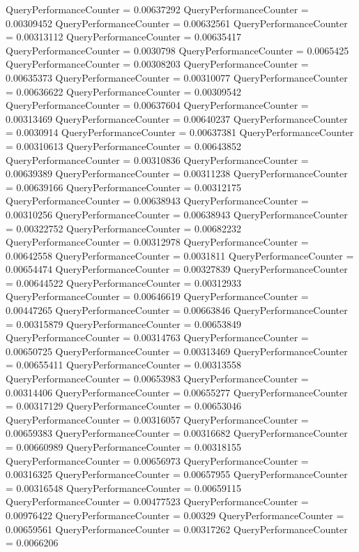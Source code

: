 \documentclass[9pt]{article}
\theoremstyle{plain}
\theoremstyle{definition}
\theoremstyle{remark}
\numberwithin{equation}{section}
\begin{document}
QueryPerformanceCounter  =  0.00637292
QueryPerformanceCounter  =  0.00309452
QueryPerformanceCounter  =  0.00632561
QueryPerformanceCounter  =  0.00313112
QueryPerformanceCounter  =  0.00635417
QueryPerformanceCounter  =  0.0030798
QueryPerformanceCounter  =  0.0065425
QueryPerformanceCounter  =  0.00308203
QueryPerformanceCounter  =  0.00635373
QueryPerformanceCounter  =  0.00310077
QueryPerformanceCounter  =  0.00636622
QueryPerformanceCounter  =  0.00309542
QueryPerformanceCounter  =  0.00637604
QueryPerformanceCounter  =  0.00313469
QueryPerformanceCounter  =  0.00640237
QueryPerformanceCounter  =  0.0030914
QueryPerformanceCounter  =  0.00637381
QueryPerformanceCounter  =  0.00310613
QueryPerformanceCounter  =  0.00643852
QueryPerformanceCounter  =  0.00310836
QueryPerformanceCounter  =  0.00639389
QueryPerformanceCounter  =  0.00311238
QueryPerformanceCounter  =  0.00639166
QueryPerformanceCounter  =  0.00312175
QueryPerformanceCounter  =  0.00638943
QueryPerformanceCounter  =  0.00310256
QueryPerformanceCounter  =  0.00638943
QueryPerformanceCounter  =  0.00322752
QueryPerformanceCounter  =  0.00682232
QueryPerformanceCounter  =  0.00312978
QueryPerformanceCounter  =  0.00642558
QueryPerformanceCounter  =  0.0031811
QueryPerformanceCounter  =  0.00654474
QueryPerformanceCounter  =  0.00327839
QueryPerformanceCounter  =  0.00644522
QueryPerformanceCounter  =  0.00312933
QueryPerformanceCounter  =  0.00646619
QueryPerformanceCounter  =  0.00447265
QueryPerformanceCounter  =  0.00663846
QueryPerformanceCounter  =  0.00315879
QueryPerformanceCounter  =  0.00653849
QueryPerformanceCounter  =  0.00314763
QueryPerformanceCounter  =  0.00650725
QueryPerformanceCounter  =  0.00313469
QueryPerformanceCounter  =  0.00655411
QueryPerformanceCounter  =  0.00313558
QueryPerformanceCounter  =  0.00653983
QueryPerformanceCounter  =  0.00314406
QueryPerformanceCounter  =  0.00655277
QueryPerformanceCounter  =  0.00317129
QueryPerformanceCounter  =  0.00653046
QueryPerformanceCounter  =  0.00316057
QueryPerformanceCounter  =  0.00659383
QueryPerformanceCounter  =  0.00316682
QueryPerformanceCounter  =  0.00660989
QueryPerformanceCounter  =  0.00318155
QueryPerformanceCounter  =  0.00656973
QueryPerformanceCounter  =  0.00316325
QueryPerformanceCounter  =  0.00657955
QueryPerformanceCounter  =  0.00316548
QueryPerformanceCounter  =  0.00659115
QueryPerformanceCounter  =  0.00477523
QueryPerformanceCounter  =  0.00976422
QueryPerformanceCounter  =  0.00329
QueryPerformanceCounter  =  0.00659561
QueryPerformanceCounter  =  0.00317262
QueryPerformanceCounter  =  0.0066206
\end{document}
